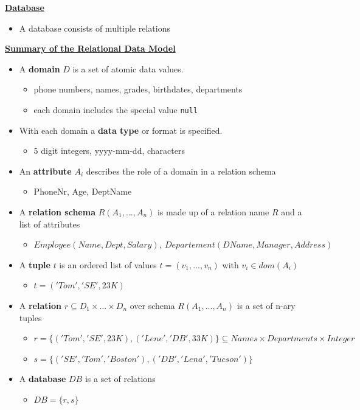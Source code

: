 \textbf{\underline{Database}}
\begin{itemize}
    \item A database consists of multiple relations
\end{itemize}

\textbf{\underline{Summary of the Relational Data Model}}
\begin{itemize}
    \item A \textbf{domain} $D$ is a set of atomic data values.
    \begin{itemize}
        \item phone numbers, names, grades, birthdates, departments
        \item each domain includes the special value \texttt{null}
    \end{itemize}
    \item With each domain a \textbf{data type} or format is specified.
    \begin{itemize}
        \item 5 digit integers, yyyy-mm-dd, characters
    \end{itemize}
    \item An \textbf{attribute} $A_i$ describes the role of a domain in a relation schema
    \begin{itemize}
        \item PhoneNr, Age, DeptName
    \end{itemize}
    \item A \textbf{relation schema} $R(A_1,...,A_n)$ is made up of a relation name $R$ and a list of attributes
    \begin{itemize}
        \item $Employee(Name,Dept,Salary),\ Departement(DName, Manager, Address)$
    \end{itemize}
    \item A \textbf{tuple} $t$ is an ordered list of values $t=(v_1,...,v_n)$ with $v_i \in dom(A_i)$
    \begin{itemize}
        \item $t=('Tom','SE',23K)$
    \end{itemize}
    \item A \textbf{relation} $r\subseteq D_1 \times ... \times D_n$ over schema $R(A_1,...,A_n)$ is a set of n-ary tuples
    \begin{itemize}
        \item $r= \{('Tom','SE',23K),('Lene','DB',33K)\}\subseteq Names \times Departments \times Integer$
        \item $s=\{('SE', 'Tom','Boston'),('DB','Lena','Tucson')\}$
    \end{itemize}
    \item A \textbf{database} $DB$ is a set of relations
    \begin{itemize}
        \item $DB=\{r,s\}$
    \end{itemize}
\end{itemize}


